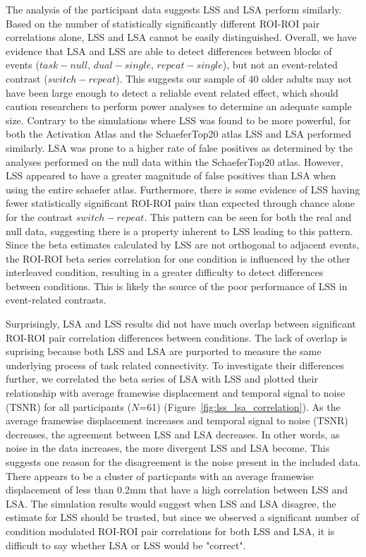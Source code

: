 \documentclass[phd,appendix,figures]{uithesis}
\begin{document}
The analysis of the participant data suggests LSS and LSA perform similarly.
Based on the number of statistically significantly different ROI-ROI pair correlations alone,
LSS and LSA cannot be easily distinguished.
Overall, we have evidence that LSA and LSS are able to detect differences between
blocks of events ($task - null$, $dual - single$, $repeat - single$), but not an event-related contrast ($switch - repeat$).
This suggests our sample of 40 older adults may not have been large enough to detect a reliable event related effect,
which should caution researchers to perform power analyses to determine an adequate sample size.
Contrary to the simulations where LSS was found to be more powerful,
for both the Activation Atlas and the SchaeferTop20 atlas LSS and LSA performed similarly.
LSA was prone to a higher rate of false positives as determined by the analyses performed on the null data within the SchaeferTop20 atlas.
However, LSS appeared to have a greater magnitude of false positives than LSA when using the entire schaefer atlas.
Furthermore, there is some evidence of LSS having fewer statistically significant ROI-ROI pairs than expected through chance alone
for the contrast $switch - repeat$.
This pattern can be seen for both the real and null data, suggesting there is a property inherent to LSS
leading to this pattern.
Since the beta estimates calculated by LSS are not orthogonal to adjacent events,
the ROI-ROI beta series correlation for one condition is influenced by the other interleaved condition,
resulting in a greater difficulty to detect differences between conditions.
This is likely the source of the poor performance of LSS in event-related contrasts.

Surprisingly, LSA and LSS results did not have much overlap between significant
ROI-ROI pair correlation differences between conditions.
The lack of overlap is suprising because both LSS and LSA are purported to
measure the same underlying process of task related connectivity.
To investigate their differences further, we correlated the beta series of LSA with LSS and plotted their relationship with
average framewise displacement and temporal signal to noise (TSNR) for all participants ($N$=61) (Figure~\ref{fig:lss_lsa_correlation}).
As the average framewise displacement increases and temporal signal to noise (TSNR)
decreases, the agreement between LSS and LSA decreases.
In other words, as noise in the data increases, the more divergent LSS and LSA become.
This suggests one reason for the disagreement is the noise present in the included
data.
There appears to be a cluster of particpants with an average framewise displacement of
less than 0.2mm that have a high correlation between LSS and LSA.
The simulation results would suggest when LSS and LSA disagree, the estimate for LSS should be
trusted, but since we observed a significant number of condition modulated ROI-ROI pair correlations for both
LSS and LSA, it is difficult to say whether LSA or LSS would be "correct".
\end{document}

